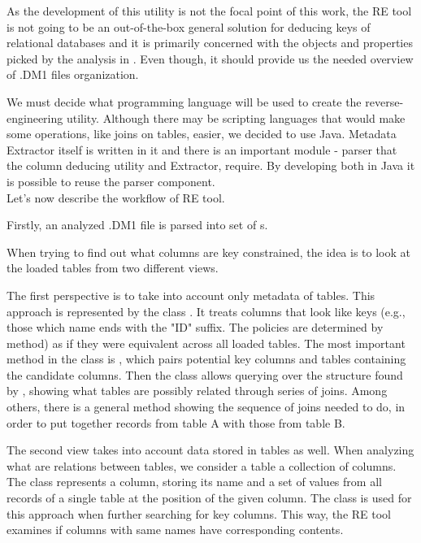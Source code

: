 As the development of this utility is not the focal point of this work, the RE tool is not going to be an out-of-the-box general solution for deducing keys of relational databases and it is primarily concerned with the objects and properties picked by the analysis in . Even though, it should provide us the needed overview of .DM1 files organization.

We must decide what programming language will be used to create the reverse-engineering utility. Although there may be scripting languages that would make some operations, like joins on tables, easier, we decided to use Java. Metadata Extractor itself is written in it and there is an important module - parser that the column deducing utility and Extractor, require. By developing both in Java it is possible to reuse the parser component. \\

Let's now describe the workflow of RE tool.

Firstly, an analyzed .DM1 file is parsed into set of s.

When trying to find out what columns are key constrained, the idea is to look at the loaded tables from two different views.

The first perspective is to take into account only metadata of tables. 
This approach is represented by the class . 
It treats columns that look like keys (e.g., those which name ends with the "ID" suffix. The policies are determined by  method) as if they were equivalent across all loaded tables.
The most important method in the class is , which pairs potential key columns and tables containing the candidate columns.
Then the class  allows querying over the structure found by , showing what tables are possibly related through series of joins.
Among others, there is a general method  showing the sequence of joins needed to do, in order to put together records from table A with those from table B.

The second view takes into account data stored in tables as well. 
When analyzing what are relations between tables, we consider a table a collection of columns. The   class represents a column, storing its name and a set of values from all records of a single table at the position of the given column.
The  class is used for this approach when further searching for key columns.
This way, the RE tool examines if columns with same names have corresponding contents.

